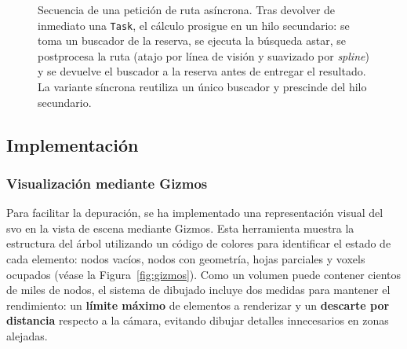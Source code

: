 \begin{figure}[htp]
{%
  }
  \caption[Secuencia de una petición de ruta asíncrona.]
  {Secuencia de una petición de ruta asíncrona.
  Tras devolver de inmediato una \texttt{Task}, el cálculo prosigue en un hilo secundario: se toma un buscador de la reserva, se ejecuta la búsqueda \gls{astar}, se postprocesa la ruta (atajo por línea de visión y suavizado por \textit{spline}) y se devuelve el buscador a la reserva antes de entregar el resultado.
  La variante síncrona reutiliza un único buscador y prescinde del hilo secundario.}
  \label{fig:seq-path}
\end{figure}

\subsection{Implementación}

\subsubsection{Visualización mediante Gizmos}

Para facilitar la depuración, se ha implementado una representación visual del \acrshort{svo} en la vista de escena mediante Gizmos.
Esta herramienta muestra la estructura del árbol utilizando un código de colores para identificar el estado de cada elemento: nodos vacíos, nodos con geometría, hojas parciales y \glspl{voxel} ocupados (véase la Figura~\ref{fig:gizmos}).
Como un volumen puede contener cientos de miles de nodos, el sistema de dibujado incluye dos medidas para mantener el rendimiento: un \textbf{límite máximo} de elementos a renderizar y un \textbf{descarte por distancia} respecto a la cámara, evitando dibujar detalles innecesarios en zonas alejadas.

